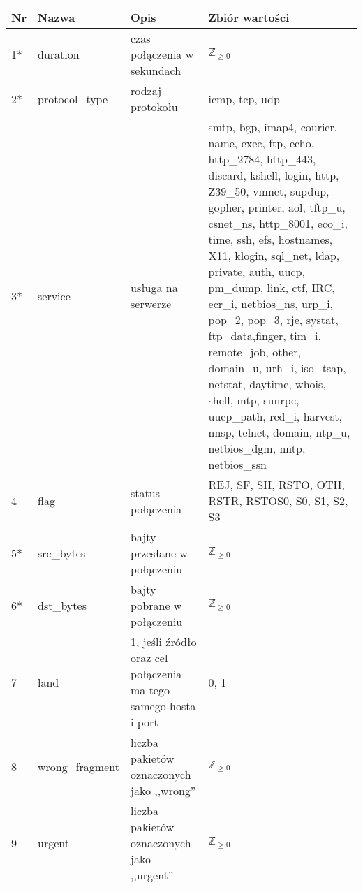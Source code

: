 \documentclass[a4paper, 12pt]{article}
\begin{document}
\begin{tabular}{ | l | p{3cm} | p{3cm} | p{6cm} | } \hline
Nr & Nazwa & Opis & Zbiór wartości \\ \hline
1*      & duration & czas połączenia w sekundach & $\mathbb Z_{\ge 0}$ \\ \hline
2*      & protocol\_type & rodzaj protokołu & icmp, tcp, udp \\ \hline
3*      & service & usługa na serwerze & smtp, bgp, imap4, courier, name, exec, ftp, echo, http\_2784,
                       http\_443, discard, kshell, login, http, Z39\_50, vmnet, supdup,
                       gopher, printer, aol, tftp\_u, csnet\_ns, http\_8001, eco\_i, time,
                       ssh, efs, hostnames, X11, klogin, sql\_net, ldap, private,
                       auth, uucp, pm\_dump, link, ctf, IRC, ecr\_i, netbios\_ns, urp\_i,
                       pop\_2, pop\_3, rje, systat, ftp\_data,finger, tim\_i, remote\_job,
                       other, domain\_u, urh\_i, iso\_tsap, netstat, daytime, whois, shell,
                       mtp, sunrpc, uucp\_path, red\_i, harvest, nnsp, telnet, domain,
                       ntp\_u, netbios\_dgm, nntp, netbios\_ssn \\ \hline
4      & flag & status połączenia & REJ, SF, SH, RSTO, OTH, RSTR, RSTOS0, S0, S1, S2, S3 \\ \hline
5*      & src\_bytes  & bajty przesłane w połączeniu & $\mathbb Z_{\ge 0}$ \\ \hline
6*      & dst\_bytes  & bajty pobrane w połączeniu  & $\mathbb Z_{\ge 0}$ \\ \hline
7      & land & 1, jeśli źródło oraz cel połączenia ma tego samego hosta i port & 0, 1 \\ \hline
8      & wrong\_fragment  & liczba pakietów oznaczonych jako ,,wrong'' & $\mathbb Z_{\ge 0}$ \\ \hline
9      & urgent  & liczba pakietów oznaczonych jako ,,urgent''  & $\mathbb Z_{\ge 0}$ \\ \hline
\end{tabular}
\end{document}
